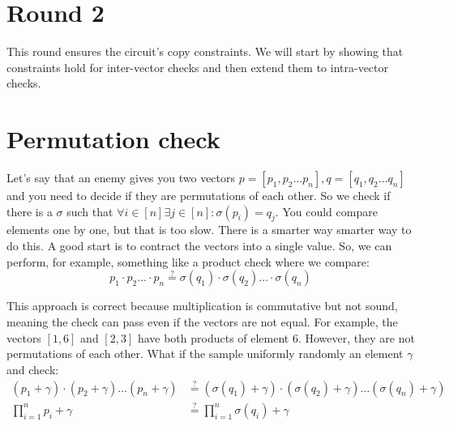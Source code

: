 \section{Round 2}
\label{chap:round2}

This round ensures the circuit's copy constraints. We will start by showing that constraints hold for inter-vector checks and then extend them to intra-vector checks.



\section{Permutation check}
\label{permutation-check}
Let's say that an enemy gives you two vectors $p = [p_1, p_2 \ldots p_n], q = [q_1, q_2 \ldots q_n]$ and you need to decide if they are permutations of each other. So we check if there is a $\sigma$ such that $\forall i \in [n] \exists j \in [n]: \sigma(p_i) = q_j$. You could compare elements one by one, but that is too slow. There is a smarter way smarter way to do this. A good start is to contract the vectors into a single value. So, we can perform, for example, something like a product check where we compare:$$p_1 \cdot p_2 \ldots \cdot p_n \stackrel{?}{=} \sigma(q_1) \cdot \sigma(q_2) \ldots \cdot \sigma(q_n)$$

This approach is correct because multiplication is commutative but not sound, meaning the check can pass even if the vectors are not equal. For example, the vectors $[1,6]$ and $[2,3]$ have both products of element 6. However, they are not permutations of each other. What if the sample uniformly randomly an element $\gamma$ and check:
\begin{align*}
    (p_1 + \gamma) \cdot (p_2 + \gamma) \ldots (p_n + \gamma) &\stackrel{?}{=} (\sigma(q_1) + \gamma) \cdot (\sigma(q_2) + \gamma) \ldots (\sigma(q_n) + \gamma) \\
    \prod_{i = 1}^n p_i + \gamma &\stackrel{?}{=} \prod_{i = 1}^n  \sigma(q_i) + \gamma
\end{align*}

